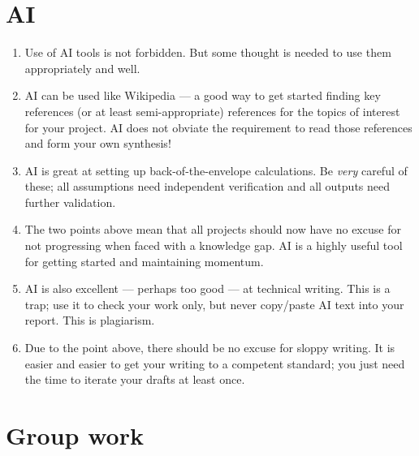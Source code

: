 \documentclass[11pt,a5paper]{article}
\begin{document}
\section{AI}

\begin{enumerate}[resume]
\item Use of AI tools is not forbidden. But some thought is needed to use them appropriately and well.

\item AI can be used like Wikipedia --- a good way to get started finding key references (or at least semi-appropriate) references for the topics of interest for
your project. AI does not obviate the requirement to read those references and form your own synthesis!

\item AI is great at setting up back-of-the-envelope calculations. Be \emph{very} careful of these; all assumptions need independent verification and all outputs need further validation.

\item The two points above mean that all projects should now have no excuse for not progressing when faced with a knowledge gap. AI is a highly useful tool for getting started and maintaining momentum.

\item AI is also excellent --- perhaps too good --- at technical writing. This is a trap; use it to check your work only, but never copy/paste AI text into your report. This is plagiarism.

\item Due to the point above, there should be no excuse for sloppy writing. It is easier and easier to get your writing to a competent standard; you just need the time to iterate your drafts at least once.
\end{enumerate}

\section{Group work}
\end{document}
